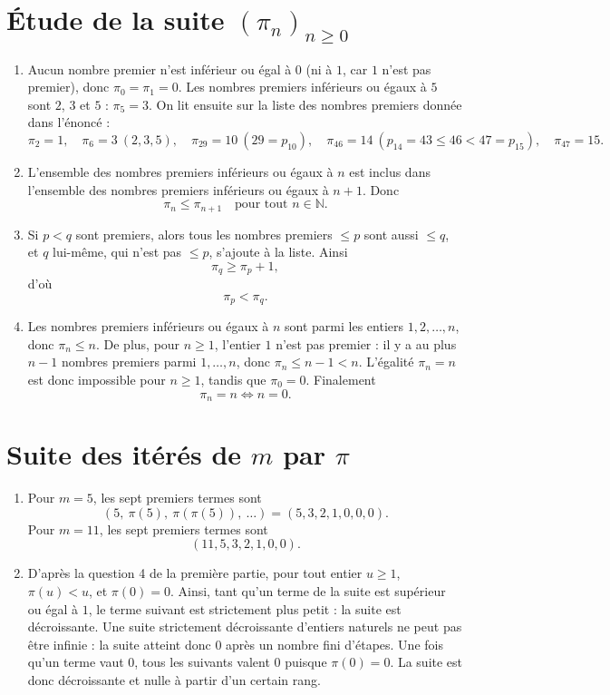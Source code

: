 \section*{Étude de la suite \( (\pi_n)_{n \geqslant 0} \)}

\begin{enumerate}
\item Aucun nombre premier n'est inférieur ou égal à $0$ (ni à $1$, car $1$ n'est pas premier), donc $\pi_0 = \pi_1 = 0$. Les nombres premiers inférieurs ou égaux à $5$ sont $2$, $3$ et $5$ : $\pi_5 = 3$. On lit ensuite sur la liste des nombres premiers donnée dans l'énoncé :
\[
\pi_2 = 1,\quad \pi_6 = 3\ (2, 3, 5),\quad \pi_{29} = 10\ (29 = p_{10}),\quad \pi_{46} = 14\ (p_{14} = 43 \leqslant 46 < 47 = p_{15}),\quad \pi_{47} = 15.
\]

\item L’ensemble des nombres premiers inférieurs ou égaux à \(n\) est inclus dans l’ensemble des nombres premiers inférieurs ou égaux à \(n+1\). Donc
\[
\pi_n \leqslant \pi_{n+1} \quad \text{pour tout } n \in \mathbb{N}.
\]

\item Si \(p < q\) sont premiers, alors tous les nombres premiers \(\leqslant p\) sont aussi \(\leqslant q\), et \(q\) lui-même, qui n'est pas \(\leqslant p\), s’ajoute à la liste. Ainsi
\[
\pi_q \geqslant \pi_p + 1,
\]
d’où
\[
\pi_p < \pi_q.
\]

\item Les nombres premiers inférieurs ou égaux à \(n\) sont parmi les entiers \(1, 2, \dots, n\), donc \(\pi_n \leqslant n\). De plus, pour \(n \geqslant 1\), l’entier \(1\) n’est pas premier : il y a au plus \(n - 1\) nombres premiers parmi \(1, \dots, n\), donc \(\pi_n \leqslant n-1 < n\). L'égalité \(\pi_n = n\) est donc impossible pour \(n \geqslant 1\), tandis que \(\pi_0 = 0\). Finalement
\[
\pi_n = n \iff n = 0.
\]
\end{enumerate}

\section*{Suite des itérés de \(m\) par \(\pi\)}

\begin{enumerate}
\item Pour \(m = 5\), les sept premiers termes sont
\[
(5,\ \pi(5),\ \pi(\pi(5)),\ \dots) = (5, 3, 2, 1, 0, 0, 0).
\]
Pour \(m = 11\), les sept premiers termes sont
\[
(11, 5, 3, 2, 1, 0, 0).
\]

\item D’après la question 4 de la première partie, pour tout entier \(u \geqslant 1\), \(\pi(u) < u\), et \(\pi(0) = 0\). Ainsi, tant qu'un terme de la suite est supérieur ou égal à \(1\), le terme suivant est strictement plus petit : la suite est décroissante. Une suite strictement décroissante d'entiers naturels ne peut pas être infinie : la suite atteint donc \(0\) après un nombre fini d'étapes. Une fois qu'un terme vaut \(0\), tous les suivants valent \(0\) puisque \(\pi(0) = 0\). La suite est donc décroissante et nulle à partir d’un certain rang.
\end{enumerate}

